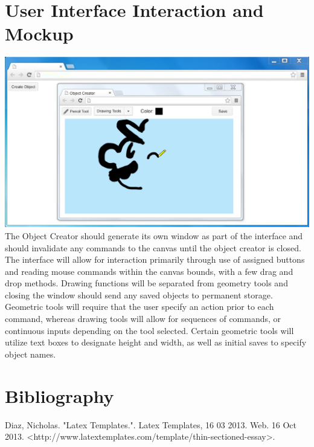 \documentclass[a4paper, 11pt]{article} %
\begin{document}

\section*{User Interface Interaction and Mockup}

\includegraphics[scale=0.58]{Mockup}\\

The Object Creator should generate its own window as part of the interface and should invalidate any commands to the canvas until the object creator is closed. The interface will allow for interaction primarily through use of assigned buttons and reading mouse commands within the canvas bounds, with a few drag and drop methods. Drawing functions will be separated from geometry tools and closing the window should send any saved objects to permanent storage. Geometric tools will require that the user specify an action prior to each command, whereas drawing tools will allow for sequences of commands, or continuous inputs depending on the tool selected. Certain geometric tools will utilize text boxes to designate height and width, as well as initial saves to specify object names.




\section*{Bibliography}

Diaz, Nicholas. "Latex Templates.". Latex Templates, 16 03 2013. Web. 16 Oct 2013. <http://www.latextemplates.com/template/thin-sectioned-essay>.

\end{document}
